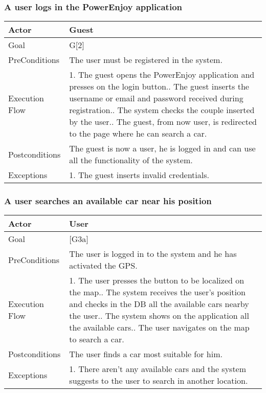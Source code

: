 \documentclass{article}
\begin{document}
	\subsubsection{A user logs in the PowerEnjoy application}
	\begin{tabularx}{\textwidth}{  l  X  }
		\hline
		Actor & Guest\\
		\hline
		Goal & G[2]\\
		\hline
		PreConditions & The user must be registered in the system.\\
		\hline
		Execution Flow & 1. The guest opens the PowerEnjoy application and presses on the login button.\newline
										 2. The guest inserts the username or email and password received during registration.\newline
										 3. The system checks the couple inserted by the user.\newline
										 4. The guest, from now user, is redirected to the page where he can search a car.\\
		\hline
		Postconditions & The guest is now a user, he is logged in and can use all the functionality of the system.\\
		\hline
		Exceptions & 1. The guest inserts invalid credentials.\\
		\hline
	\end{tabularx}

	\subsubsection{A user searches an available car near his position}
	\begin{tabularx}{\textwidth}{  l  X  }
		\hline
		Actor & User\\
		\hline
		Goal & [G3a]\\
		\hline
		PreConditions & The user is logged in to the system and he has activated the GPS.\\
		\hline
		Execution Flow & 1. The user presses the button to be localized on the map.\newline
										 2. The system receives the user's position and checks in the DB all the available cars nearby the user.\newline
										 3. The system shows on the application all the available cars.\newline
										 4. The user navigates on the map to search a car.\\
		\hline
		Postconditions & The user finds a car most suitable for him.\\
		\hline
		Exceptions & 1. There aren't any available cars and the system suggests to the user to search in another location.\\
		\hline
	\end{tabularx}
\end{document}
